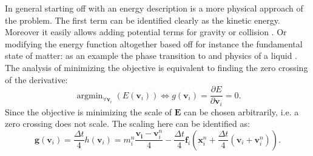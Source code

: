 \documentclass[m,times]{cgMA}
\DeclareMathOperator*{\argmin}{arg min}
\begin{document}
In general starting off with an energy description is a more physical approach of the problem. The first term can be identified clearly as the kinetic energy. Moreover it easily allows adding potential terms for gravity or collision \cite{MPM:OPTIMI_INTEGR}. Or modifying the energy function altogether based off for instance the fundamental state of matter: as an example the phase transition to and physics of a liquid \cite{MPM:PHASE_CHANGE}.
The analysis of minimizing the objective is equivalent to finding the zero crossing of the derivative:
\begin{equation}
  \argmin_{\forall \boldsymbol{v}_i}(E(\boldsymbol{v}_i)) \Leftrightarrow g(\boldsymbol{v}_i) = \frac{\partial E}{\partial \boldsymbol{v}_i} = 0.
\end{equation}
Since the objective is minimizing the scale of $\boldsymbol{E}$ can be chosen arbitrarily, i.e. a zero crossing does not scale. The scaling here can be identified as:
\begin{equation}
  \boldsymbol{g}(\boldsymbol{v}_i) = \frac{\Delta t}{4} h(\boldsymbol{v}_i) = m_i^n \frac{\boldsymbol{v_i}-\boldsymbol{v}_i^n}{4} -\frac{\Delta t}{4} \boldsymbol{f}_i\left(\boldsymbol{x}_i^n + \frac{\Delta t}{4} (\boldsymbol{v}_i + \boldsymbol{v}_i^{n})\right).
\end{equation}
\cite{MPM:COURSE}\cite{MPM:APIC}
\end{document}
